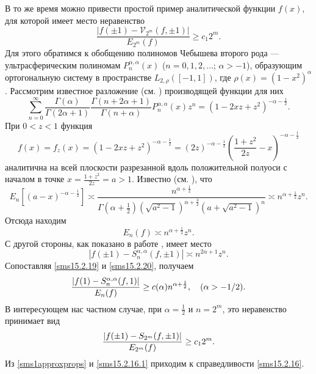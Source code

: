 В то же время можно привести простой пример аналитической функции $f(x)$, для которой имеет место неравенство
\begin{equation}
\label{sms15.2.16}
\frac{|f(\pm1)-\mathcal{V}_{2^m}(f, \pm1)|}{ E_{2^m}(f)}\ge
c_1 2^m.
\end{equation}
Для этого обратимся к обобщению полиномов Чебышева второго рода --- ультрасферическим полиномам $P_n^{\alpha, \alpha}(x)$ ($n =0,1,2,\ldots$; $\alpha > -1$), образующим ортогональную систему в пространстве $L_{2, \rho}([-1,1])$, где $\rho(x)=(1-x^2)^{\alpha}$.
Рассмотрим известное разложение (см. \cite{Haar-Tcheb-Sege})
производящей функции для них
\begin{equation}
\label{sms15.2.17}
\sum_{n=0}^\infty\frac{\Gamma(\alpha)}{\Gamma(2\alpha+1)}\frac{
     \Gamma(n+2\alpha+1)}{\Gamma(n+\alpha)}P_n^{\alpha,\alpha}(x)
     z^n=(1-2xz+z^2)^{-\alpha-\frac12}.
\end{equation}
При $0<z<1$ функция
\begin{equation}
\label{sms15.2.18}
f(x)=f_z(x)=(1-2xz+z^2)^{-\alpha-\frac12}=(2z)^{-\alpha-\frac12}
     \left({\frac{1+z^2}{2z}}-x\right)^{-\alpha-\frac12}
\end{equation}
аналитична  на всей плоскости  разрезанной вдоль положительной полуоси с началом в точке $x=\frac{1+z^2}{2z}=a>1$. Известно (см. \cite{sob-jac-discrete-Timan}),
что
\begin{equation}
 E_n[(a-x)^{-\alpha-\frac12}]\asymp \frac{n^{\alpha+\frac12}}{
\Gamma\left(\alpha+\frac12\right)(\sqrt{a^2-1})^{\alpha+\frac32}(a+\sqrt{a^2-1})^n}
     \asymp n^{\alpha+\frac12}z^n.
\end{equation}
Отсюда находим
\begin{equation}
\label{sms15.2.19}
E_n(f)\asymp n^{\alpha+\frac12}z^n.
\end{equation}
С другой стороны, как показано в работе \cite{sms18},
имеет место
\begin{equation}
\label{sms15.2.20}
|f(\pm1)- S_n^{\alpha,\alpha}(f,\pm1)| \asymp n^{2\alpha+1}z^n.
\end{equation}
Сопоставляя \eqref{sms15.2.19} и \eqref{sms15.2.20}, получаем
\begin{equation*}
\label{sms15.2.21}
{|f(1)-S_n^{\alpha,\alpha}(f, 1)|\over E_n(f)}\ge
c(\alpha)n^{\alpha+\frac12}, \quad (\alpha>-1/2).
\end{equation*}
В интересующем нас частном случае, при $\alpha=\frac12$ и $n = 2^m$, это неравенство принимает вид
\begin{equation}
\label{sms15.2.16.1}
{|f(\pm1)-S_{2^m}(f, \pm1)|\over E_{2^m}(f)} \ge c_1 2^m.
\end{equation}
Из \eqref{sms1approxprops} и \eqref{sms15.2.16.1} приходим к справедливости \eqref{sms15.2.16}.


